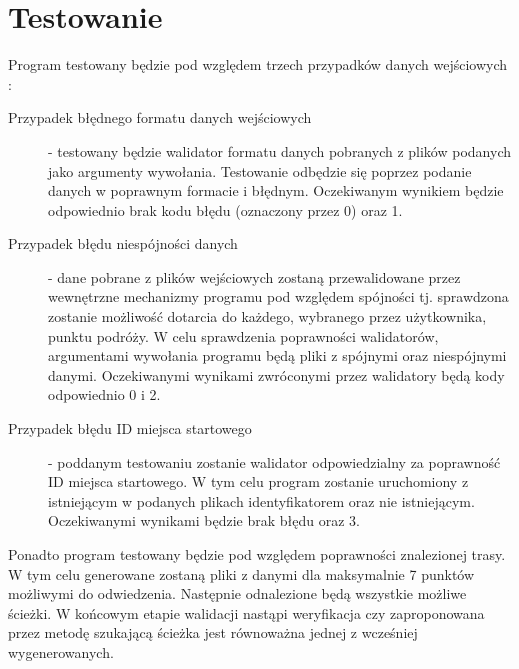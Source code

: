 \documentclass[10pt,oneside]{article}
\begin{document}
\section{Testowanie}
Program testowany będzie pod względem trzech przypadków danych wejściowych :
\begin{description}
	\item[Przypadek błędnego formatu danych wejściowych] - testowany będzie walidator formatu danych pobranych z plików podanych jako argumenty wywołania. Testowanie odbędzie się poprzez podanie danych w poprawnym formacie i błędnym. Oczekiwanym wynikiem będzie odpowiednio brak kodu błędu (oznaczony przez 0) oraz 1.
	
	\item[Przypadek błędu niespójności danych] - dane pobrane z plików wejściowych zostaną przewalidowane przez wewnętrzne mechanizmy programu pod względem spójności tj. sprawdzona zostanie możliwość dotarcia do każdego, wybranego przez użytkownika, punktu podróży. W celu sprawdzenia poprawności walidatorów, argumentami wywołania programu będą pliki z spójnymi oraz niespójnymi danymi. Oczekiwanymi wynikami zwróconymi przez walidatory będą kody odpowiednio 0 i 2.
	
	\item[Przypadek błędu ID miejsca startowego] - poddanym testowaniu zostanie walidator odpowiedzialny za poprawność ID miejsca startowego. W tym celu program zostanie uruchomiony z istniejącym w podanych plikach identyfikatorem oraz nie istniejącym. Oczekiwanymi wynikami będzie brak błędu oraz 3.
\end{description}
Ponadto program testowany będzie pod względem poprawności znalezionej trasy. W tym celu generowane zostaną pliki z danymi dla maksymalnie 7 punktów możliwymi do odwiedzenia. Następnie odnalezione będą wszystkie możliwe ścieżki. W końcowym etapie walidacji nastąpi weryfikacja czy zaproponowana przez metodę szukającą ścieżka jest równoważna jednej z wcześniej wygenerowanych.
\end{document}
